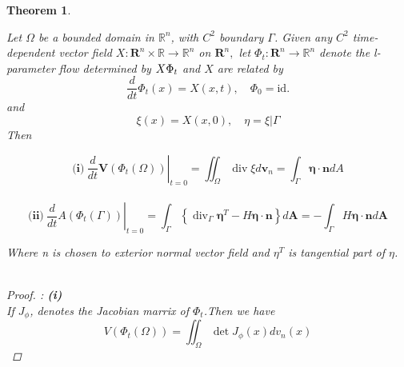 \documentclass[oneside]{book}
\newtheorem{theorem}{Theorem}[section]
\begin{document}
\begin{theorem}
\label{t:3}














 Let $\Omega$ be a bounded domain in $\mathbb{R}^{n}$, with $C^{2}$ boundary $\Gamma$. Given
any $C^{2}$ time-dependent vector field $X: \mathbf{R}^{n} \times \mathbb{R} \rightarrow \mathbb{R}^{n}$ on $\mathbf{R}^{n},$ let $\Phi_{t}: \mathbf{R}^{n} \rightarrow \mathbb{R}^{n}$
denote the l-parameter flow determined by $X\\ \Phi_{t}$ and $X$ are related by $$\frac{d}{d t} \Phi_{t}(x)=X(x, t), \quad \Phi_{0}=\mathrm{id.}$$
 and $$\xi(x)=X(x, 0), \quad \eta=\xi | \Gamma$$
 Then 
 
 
 
 
 
 \begin{equation}
  \label{eq23}
      {\textbf{(i)}}\ \left.\frac{d}{d t} \mathbf{V}\left(\Phi_{t}(\Omega)\right)\right|_{t=0}=\iint_{\Omega} \operatorname{div} \xi d \mathbf{v}_{n}=\int_{\Gamma} \boldsymbol{\eta} \cdot \mathbf{n} d A
  \end{equation}    
    \\
    
    
    
    
    
    
    
 \begin{equation}
  \label{eq24}
 {\textbf{(ii)}}\  \left.\frac{d}{d t} A\left(\Phi_{t}(\Gamma)\right)\right|_{t=0}=\int_{\Gamma}\left\{\operatorname{div}_{\Gamma} \boldsymbol{\eta}^{T}-H \boldsymbol{\eta} \cdot \mathbf{n}\right\} d \boldsymbol{A}=-\int_{\Gamma} H \boldsymbol{\eta} \cdot \mathbf{n} d \boldsymbol{A}
 \end{equation}
 


 Where n is chosen to exterior normal vector field and ${\eta}^{T}$ is tangential part of  $\eta$.\\\\
 

\begin{proof}: \textbf{(i)}  \\
If $J_{\phi}$, denotes the Jacobian marrix of $\Phi_{t}$.Then we have \\

 
\begin{equation}
 \label{eq25}
    V\left(\Phi_{t}(\Omega)\right)=\iint_{\Omega} \operatorname{det} J_{\phi}(x) d v_{n}(x)
     \end{equation} 
    

\end{proof}
\end{theorem}
\end{document}
